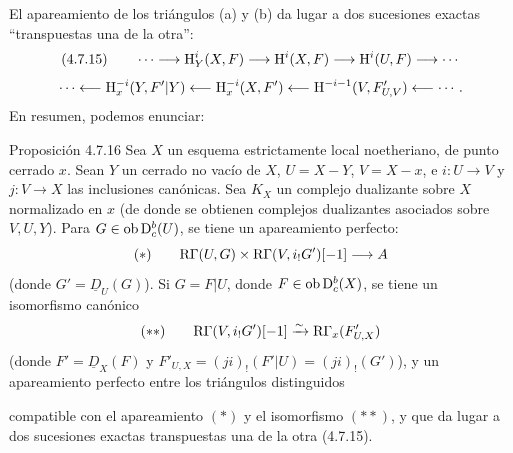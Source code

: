 El apareamiento de los triángulos (a) y (b) da lugar a dos sucesiones exactas \textquotedblleft transpuestas una de la otra\textquotedblright{}:
\[
(4.7.15)\qquad \cdots\longrightarrow \mathrm{H}_Y^i(X,F)\longrightarrow\mathrm{H}^i(X,F)\longrightarrow\mathrm{H}^i(U,F)\longrightarrow\cdots
\]
\[
\cdots\longleftarrow \mathrm{H}_x^{-i}(Y,F'|Y)\longleftarrow\mathrm{H}_x^{-i}(X,F')\longleftarrow\mathrm{H}^{-i-1}(V,F'_{U,V})\longleftarrow\cdots.
\]
En resumen, podemos enunciar:

\begin{statement}{Proposición 4.7.16}
Sea $X$ un esquema estrictamente local noetheriano, de punto cerrado $x$. Sean $Y$ un cerrado no vacío de $X$, $U=X-Y$, $V=X-x$, e $i:U\to V$ y $j:V\to X$ las inclusiones canónicas. Sea $K_X$ un complejo dualizante sobre $X$ normalizado en $x$ (de donde se obtienen complejos dualizantes asociados sobre $V,U,Y$). Para $G\in\operatorname{ob}\mathrm{D}_c^b(U)$, se tiene un apareamiento perfecto:
\[
(*)\qquad \mathrm{R}\Gamma(U,G)\times\mathrm{R}\Gamma(V,i_!G')[-1]\longrightarrow A
\]
(donde $G'=\underline{D}_U(G)$). Si $G=F|U$, donde $F\in\operatorname{ob}\mathrm{D}_c^b(X)$, se tiene un isomorfismo canónico
\[
(**)\qquad \mathrm{R}\Gamma(V,i_!G')[-1]\xrightarrow{\sim}\mathrm{R}\Gamma_x(F'_{U,X})
\]
(donde $F'=\underline{D}_X(F)$ y $F'_{U,X}=(ji)_!(F'|U)=(ji)_!(G')$), y un apareamiento perfecto entre los triángulos distinguidos
\begin{center}
\end{center}
compatible con el apareamiento $(*)$ y el isomorfismo $(**)$, y que da lugar a dos sucesiones exactas transpuestas una de la otra (4.7.15).
\end{statement}

